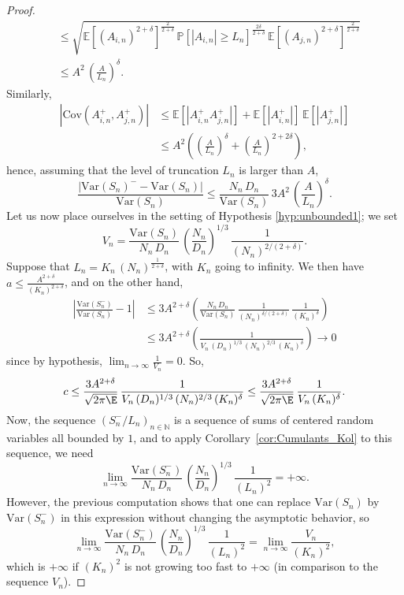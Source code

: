 \documentclass[envcountsame]{svmult}
\newcommand{\N}{\mathbb{N}}
\newcommand{\esper}{\mathbb{E}}
\newcommand{\proba}{\mathbb{P}}
\newcommand{\var}{\mathrm{Var}}
\newcommand{\cov}{\mathrm{Cov}}
\begin{document}
\begin{proof}
\begin{align*}
&\leq \sqrt{\esper[(A_{i,n})^{2+\delta}]^{\frac{2}{2+\delta}}\,\proba[|A_{i,n}| \geq L_n]^{\frac{2\delta}{2+\delta}}\,\esper[(A_{j,n})^{2+\delta}]^{\frac{2}{2+\delta}} } \\
&\leq A^2\,\left(\frac{A}{L_n}\right)^{\!\delta}.
\end{align*}
Similarly, 
\begin{align*}
|\cov(A_{i,n}^+,A_{j,n}^+)| &\leq \esper[|A_{i,n}^+A_{j,n}^+|] + \esper[|A_{i,n}^+|]\,\esper[|A_{j,n}^+|]\\
&\leq A^2\left(\left(\frac{A}{L_n}\right)^\delta + \left(\frac{A}{L_n}\right)^{2+2\delta}\right),
\end{align*}
hence, assuming that the level of truncation $L_n$ is larger than $A$,
$$\frac{|\var(S_n)^- - \var(S_n)|}{\var(S_n)} \leq \frac{N_n\,D_n}{\var(S_n)}\,3A^2\,\left(\frac{A}{L_n}\right)^{\!\delta}.$$
Let us now place ourselves in the setting of Hypothesis \ref{hyp:unbounded1}; we set 
$$ V_n = \frac{\var(S_n)}{N_n\,D_n}\,\left(\frac{N_n}{D_n}\right)^{\!1/3}\,\frac{1}{(N_n)^{2/(2+\delta)}}.$$
Suppose that $L_n = K_n\,(N_n)^{\frac{1}{2+\delta}}$, with $K_n$ going to infinity. We then have $a \leq \frac{A^{2+\delta}}{(K_n)^{2+\delta}}$, and on the other hand,
\begin{align*}
\left|\frac{\var(S_n^-)}{\var(S_n)}-1\right| &\leq  3A^{2+\delta}\left(\frac{N_n\,D_n}{\var(S_n)}\,\frac{1}{(N_n)^{\delta/(2+\delta)}}\,\frac{1}{(K_n)^{\delta}}\right) \\
&\leq 3A^{2+\delta} \left(\frac{1}{V_n\,(D_n)^{1/3}\,(N_n)^{2/3}\,(K_n)^\delta}\right) \to 0
\end{align*}
since by hypothesis, $\lim_{n \to \infty} \frac{1}{V_n} = 0$. So, 
$$c \leq \frac{3A^{2+\delta}}{\sqrt{2\pi\E}}\,\frac{1}{V_n\,(D_n)^{1/3}\,(N_n)^{2/3}\,(K_n)^\delta} \leq \frac{3A^{2+\delta}}{\sqrt{2\pi\E}}\,\frac{1}{V_n\,(K_n)^\delta}.$$ 
Now, the sequence $(S_n^-/L_n)_{n \in \N}$ is a sequence of sums of centered random variables all bounded by $1$, 
and to apply Corollary~\ref{cor:Cumulants_Kol} to this sequence, we need
$$\lim_{n \to \infty} \frac{\var(S_n^-)}{N_n\,D_n}\,\left(\frac{N_n}{D_n}\right)^{\!1/3}\,\frac{1}{(L_n)^2} = +\infty.$$
However, the previous computation shows that one can replace $\var(S_n)$ by $\var(S_n^-)$ in this expression without changing the asymptotic behavior, so
$$
\lim_{n \to \infty} \frac{\var(S_n^-)}{N_n\,D_n}\,\left(\frac{N_n}{D_n}\right)^{\!1/3}\,\frac{1}{(L_n)^2} = \lim_{n \to \infty} \frac{V_n}{(K_n)^2}, $$
which is $+\infty$ if $(K_n)^2$ is not growing too fast to $+\infty$ (in comparison to the sequence $V_n$). 

\end{proof}
\end{document}
